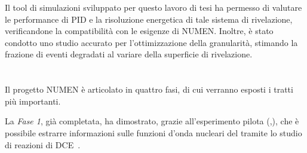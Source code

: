 Il tool di simulazioni sviluppato per questo lavoro di tesi ha permesso di valutare le performance di PID e la risoluzione energetica di tale sistema di rivelazione, verificandone la compatibilità con le esigenze di NUMEN.
Inoltre, è stato condotto uno studio accurato per l'ottimizzazione della granularità, stimando la frazione di eventi degradati al variare della superficie di rivelazione. 






\section{}

Il progetto NUMEN è articolato in quattro fasi, di cui verranno esposti i tratti più importanti. 

La \emph{Fase 1}, già completata, ha dimostrato, grazie all'esperimento pilota (,), che è possibile estrarre informazioni sulle funzioni d'onda nucleari del \doppiobeta{} tramite lo studio di reazioni di DCE~\cite{cappuzzello:epja15}.

